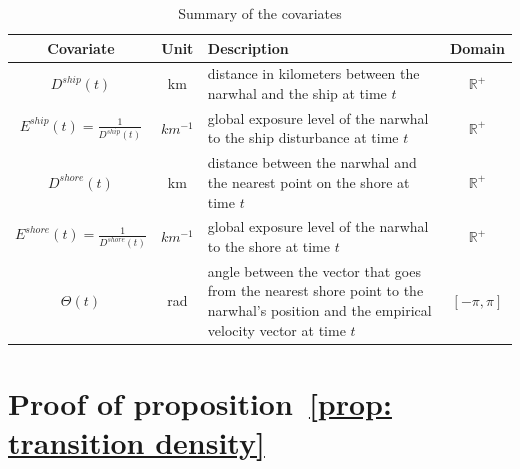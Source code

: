 \documentclass[11pt]{article}
\newcommand {\R}{\mathbb{R}}
\newcommand {\1}{\mathbb{1}}
\theoremstyle{definition}
\theoremstyle{remark}
\theoremstyle{remark}
\begin{document}
\begin{table}[H]
	\centering
	\begin{tabular}{|c|c|p{8cm}|c|}
		\hline
		Covariate & Unit & Description & Domain \\
		\hline
		$D^{ship}(t)$ & km & distance in kilometers between the narwhal and the ship at time $t$ & $\R^+$ \\
		\hline
		\hline
		$E^{ship}(t)=\frac{1}{D^{ship}(t)}$ & $km^{-1}$ & global exposure level of the narwhal to the ship disturbance at time $t$ & $\R^+$ \\
		\hline
		$D^{shore}(t)$ & km & distance between the narwhal and the nearest point on the shore at time $t$ & $\R^+$ \\
		\hline
		$E^{shore}(t)=\frac{1}{D^{shore}(t)}$ & $km^{-1}$ & global exposure level of the narwhal to the shore at time $t$ & $\R^+$ \\
		\hline
		$\Theta(t)$ & rad & angle between the vector that goes from the nearest shore point to the narwhal's position and the empirical velocity vector at time $t$  & $[-\pi,\pi]$ \\
		\hline 
	\end{tabular}
	\caption{Summary of the covariates}
	\label{tab: covariates}
\end{table}


\section{Proof of proposition~\ref{prop: transition density}}
\label{section: transition density proof}
\end{document}
